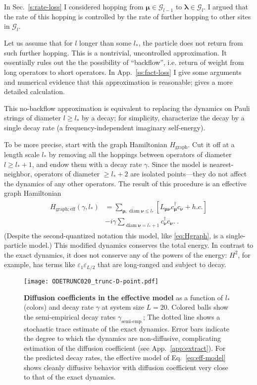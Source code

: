 \documentclass[aps,prb,nofootinbib,twocolumn,balancelastpage,amsmath,amssymb,floatfix,superscriptaddress,]{revtex4-1}
\newcommand{\graph}{\mathrm{graph}}
\DeclareMathOperator{\diam}{diam}
\newcommand{\pool}{\mathcal G}
\newcommand{\semiemp}{\text{semi-emp.}}
\begin{document}
{In Sec.~\ref{s:rate-loss} I considered hopping from $\bm \mu \in \pool_{l-1}$ to $\bm \lambda \in \pool_l$.
I argued that the rate of this hopping is controlled by the rate of further hopping to other sites in $\pool_l$.

Let us assume that for $l$ longer than some $l_*$, the particle does not return from such further hopping.
This is a nontrivial, uncontrolled approximation.
It essentially rules out the the possibility of ``backflow'', i.e. return of weight from long operators to short operators.
In App.~\ref{ss:fact-loss} I give some arguments and numerical evidence that this approximation is reasonable;
 gives a more detailed calculation.

This no-backflow approximation is equivalent to replacing the dynamics on Pauli strings of diameter $l \ge l_*$ by a decay;
for simplicity, characterize the decay by a single decay rate
(a frequency-independent imaginary self-energy).

To be more precise, start with the graph Hamiltonian $H_{\graph}$.
Cut it off at a length scale $l_*$ by 
removing all the hoppings between operators of diameter $l \ge l_*+1$,
and endow them with a decay rate $\gamma$.
Since the model is nearest-neighbor, operators of diameter $\ge l_* + 2$ are isolated points---they do not affect the dynamics of any other operators.
The result of this procedure is an effective graph Hamiltonian
\begin{align}
  \label{eq:eff-model}
  \begin{split}
    H_{\graph;\mathrm{eff}}(\gamma,l_*) &= \sum_{\bm \mu, \diam \bm \nu \le l_*} [L_{\bm\mu\bm\nu}c^\dagger_{\bm\mu} c_{\bm\nu} + h.c.]\\
    &- i\gamma \sum_{\diam \bm \nu = l_* +1} c^\dagger_{\bm \nu} c_{\bm \nu}.\;.
  \end{split}
\end{align}
(Despite the second-quantized notation this model, like \eqref{eq:Hgraph}, is a single-particle model.)
This modified dynamics conserves the total energy.
In contrast to the exact dynamics, it does not conserve any of the powers of the energy:
$H^2$, for example,
has terms like $\varepsilon_1 \varepsilon_{L/2}$ that are long-ranged and subject to decay.



\begin{figure}[t]
  \texttt{[image: ODETRUNC020\_trunc-D-point.pdf]}
  \caption{
    \textbf{ Diffusion coefficients in the effective model}
    as a function of $l_*$ (colors)
    and decay rate $\gamma$
     at system size $L = 20$.
    Colored balls show the semi-empirical decay rates $\gamma_{\semiemp}$;
    The dotted line shows a stochastic trace estimate of the exact dynamics.
    Error bars indicate the degree to which the dynamics are non-diffusive,
    complicating estimation of the diffusion coefficient (see App.~\ref{app:extract}).
    For the predicted decay rates,
    the effective model of Eq.~\eqref{eq:eff-model}
    shows cleanly diffusive behavior with diffusion coefficient very close to that of the exact dynamics.
  }
  \label{fig:diffusion}
\end{figure}

}
\end{document}
